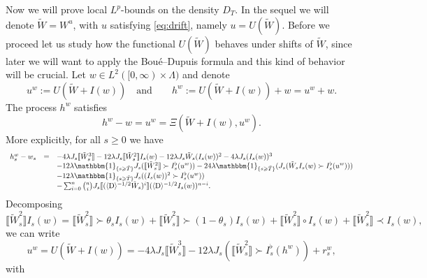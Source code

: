 \documentclass[11pt]{article}
\newcommand{\assign}{:=}
\newcommand{\mathD}{\mathrm{D}}
\begin{document}
Now we will prove local $L^p$-bounds on the density $D_T$. In the sequel we
will denote $\tilde{W} = W^u$, with $u$ satisfying {\eqref{eq:drift}}, namely
$u = U (\tilde{W})$. Before we proceed let us study how the functional $U
(\tilde{W})$ behaves under shifts of $\tilde{W}$, since later we will want to
apply the Bou{\'e}--Dupuis formula and this kind of behavior will be crucial.
Let $w \in L^2 ([0, \infty) \times \Lambda)$ and denote
\[ u^w \assign U (\tilde{W} + I (w)) \quad \text{and} \qquad h^w \assign U
   (\tilde{W} + I (w)) + w = u^w + w. \]
The process $h^w$ satisfies
\[ h^w - w = u^w = \Xi (\tilde{W} + I (w), u^w) . \]
More explicitly, for all $s \geqslant 0$ we have
\[ \begin{array}{lll}
     h^w_s - w_s & = & - 4 \lambda J_s \llbracket \tilde{W}_s^3 \rrbracket -
     12 \lambda J_s \llbracket \tilde{W}_s^2 \rrbracket I_s (w) - 12 \lambda
     J_s \tilde{W}_s (I_s (w))^2 - 4 \lambda J_s (I_s (w))^3\\
     &  & - 12 \lambda \mathbbm{1}_{\{ s \geqslant \bar{T} \}} J_s
     (\llbracket \tilde{W}^2_s \rrbracket \succ I_s^{\flat} (u^w)) - 24
     \lambda \mathbbm{1}_{\{ s \geqslant \bar{T} \}} (J_s (\tilde{W}_s I_s (w)
     \succ I^{\flat}_s (u^w)))\\
     &  & - 12 \lambda \mathbbm{1}_{\{ s \geqslant \bar{T} \}} J_s ((I_s
     (w))^2 \succ I^{\flat}_s (u^w))\\
     &  & - \sum_{i = 0}^n \binom{n}{i} J_s \llbracket (\langle \mathD
     \rangle^{- 1 / 2} \tilde{W}_s)^i \rrbracket (\langle \mathD \rangle^{- 1
     / 2} I_s (w))^{n - i} .
   \end{array} \]
Decomposing
\[ \llbracket \tilde{W}_s^2 \rrbracket I_s (w) = \llbracket \tilde{W}_s^2
   \rrbracket \succ \theta_s I_s (w) + \llbracket \tilde{W}_s^2 \rrbracket
   \succ (1 - \theta_s) I_s (w) + \llbracket \tilde{W}_s^2 \rrbracket \circ
   I_s (w) + \llbracket \tilde{W}_s^2 \rrbracket \prec I_s (w), \]
we can write
\begin{equation}
  u^w = U (\tilde{W} + I (w)) = - 4 \lambda J_s \llbracket \tilde{W}_s^3
  \rrbracket - 12 \lambda J_s (\llbracket \tilde{W}_s^2 \rrbracket \succ
  I_s^{\flat} (h^w)) + r_s^w, \label{eq:uw}
\end{equation}
with
\end{document}

